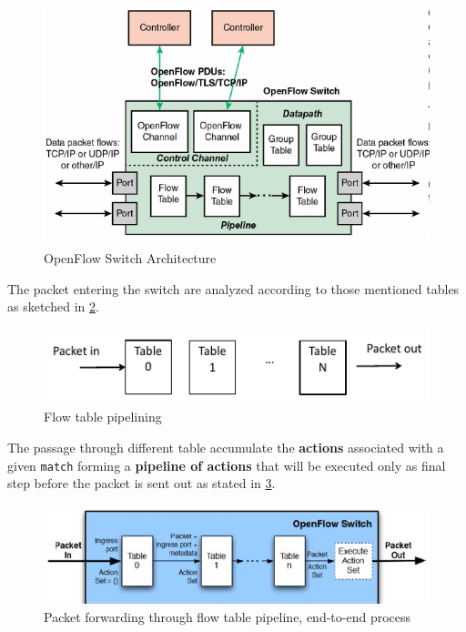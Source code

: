 \documentclass[10pt,a4paper]{report}
\theoremstyle{definition}
\begin{document}
\begin{figure}[h!]
	\centering\includegraphics[scale=0.50]{images/Pasted image 20230322170913.png}
	\caption{OpenFlow Switch Architecture}
	\label{openflow-switch}
\end{figure}
The packet entering the switch are analyzed according to those mentioned tables as sketched in \ref{switch-pipeline}.
\begin{figure}[h!]
	\centering\includegraphics[scale=0.50]{images/Pasted image 20230322171338.png}
	\caption{Flow table pipelining}
	\label{switch-pipeline}
\end{figure}
The passage through different table accumulate the \textbf{actions} associated with a given \texttt{match} forming a \textbf{pipeline of actions} that will be executed only as final step before the packet is sent out as stated in \ref{sent-out-pipeline}. 
\begin{figure}[h!]
	\centering\includegraphics[scale=0.50]{images/Pasted image 20230322171528.png}
	\caption{Packet forwarding through flow table pipeline, end-to-end process}
	\label{sent-out-pipeline}
\end{figure}
\end{document}
